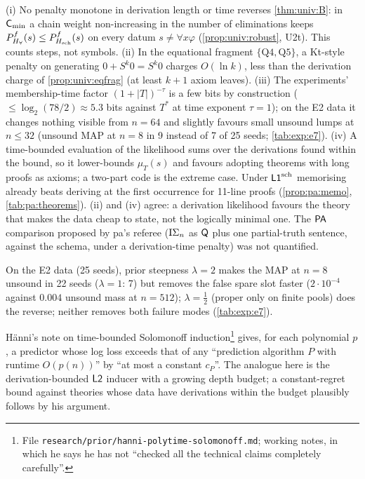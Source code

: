 \begin{remark}\label{rem:time:links}
(i) No penalty monotone in derivation length or time reverses \cref{thm:univ:B}: in $\mathsf{C}_{\min}$ a chain weight non-increasing in the number of eliminations keeps $P^f_{H_{\forall}}(s)\le P^f_{H_{\mathrm{sch}}}(s)$ on every datum $s\ne\forall x\varphi$ (\cref{prop:univ:robust}, U2t). This counts steps, not symbols.
(ii) In the equational fragment $\{\text{Q4},\text{Q5}\}$, a Kt-style penalty on generating $0+S^k0=S^k0$ charges $O(\ln k)$, less than the derivation charge of \cref{prop:univ:eqfrag} (at least $k+1$ axiom leaves).
(iii) The experiments' membership-time factor $(1+|T|)^{-\tau}$ is a few bits by construction ($\le\log_2(78/2)\approx5.3$ bits against $T^*$ at time exponent $\tau=1$); on the E2 data it changes nothing visible from $n=64$ and slightly favours small unsound lumps at $n\le32$ (unsound MAP at $n=8$ in 9 instead of 7 of 25 seeds; \cref{tab:exp:e7}).
(iv) A time-bounded evaluation of the likelihood sums over the derivations found within the bound, so it lower-bounds $\mu_T(s)$ and favours adopting theorems with long proofs as axioms; a two-part code is the extreme case. Under $\mathord{\mathsf{L1}}^{\mathrm{sch}}$ memorising already beats deriving at the first occurrence for 11-line proofs (\cref{prop:pa:memo}, \cref{tab:pa:theorems}).
(ii) and (iv) agree: a derivation likelihood favours the theory that makes the data cheap to state, not the logically minimal one. The $\mathsf{PA}$ comparison proposed by pa's referee ($\mathrm{I}\Sigma_{n}$ as $\mathsf{Q}$ plus one partial-truth sentence, against the schema, under a derivation-time penalty) was not quantified.
\end{remark}

\begin{remark}\label{rem:time:e7}
On the E2 data (25 seeds), prior steepness $\lambda=2$ makes the MAP at $n=8$ unsound in 22 seeds ($\lambda=1$: 7) but removes the false spare slot faster ($2\cdot10^{-4}$ against $0.004$ unsound mass at $n=512$); $\lambda=\tfrac12$ (proper only on finite pools) does the reverse; neither removes both failure modes (\cref{tab:exp:e7}).
\end{remark}

\begin{conjecture}\label{conj:time:polytime}
H\"anni's note on time-bounded Solomonoff induction\footnote{File \texttt{research/prior/hanni-polytime-solomonoff.md}; working notes, in which he says he has not ``checked all the technical claims completely carefully''.} gives, for each polynomial $p$, a predictor whose log loss exceeds that of any ``prediction algorithm $P$ with runtime $O(p(n))$'' by ``at most a constant $c_P$''. The analogue here is the derivation-bounded $\mathord{\mathsf{L2}}$ inducer with a growing depth budget; a constant-regret bound against theories whose data have derivations within the budget plausibly follows by his argument.
\end{conjecture}
